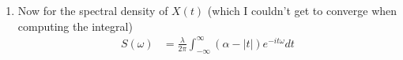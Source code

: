 \documentclass[12pt]{article}
\theoremstyle{plain}
\theoremstyle{definition}
\theoremstyle{remark}
\begin{document}
\begin{enumerate}
\begin{enumerate}
\begin{enumerate}
        \item Now for the spectral density of $X(t)$ (which I couldn't
          get to converge when computing the integral)
        \begin{align*}
          S(\omega)
           &= \frac{\lambda}{2\pi} \int^\infty_{-\infty} (\alpha-|t|)e^{-it\omega} dt
        \end{align*}
      \end{enumerate}
    \end{enumerate}


\end{enumerate}
\end{document}
